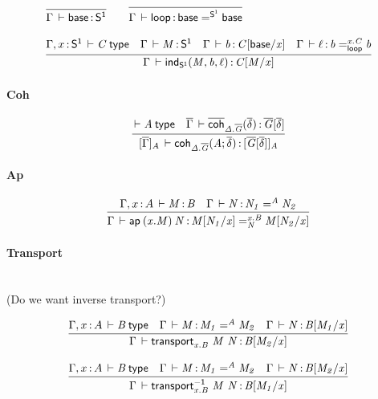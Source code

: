\paragraph{\sone}

\begin{small}
\[
\begin{array}{l}
\infer{\oftp{\Gamma}{\base}{\sone}}{}
\qquad
\infer{\oftp{\Gamma}{\lp}{\iid{\sone}{\base}{\base}}}{}
\\ \\
\infer{\oftp{\Gamma}{\sind{M}{b}{\ell}}{\subst{C}{M}{x}}}
      {\wftp{\Gamma,\tptm{x}{\sone}}{C}
      &\oftp{\Gamma}{M}{\sone}
      &\oftp{\Gamma}{b}{\subst{C}{\base}{x}}
      &\oftp{\Gamma}{\ell}{\iidover{x.C}{\lp}{b}{b}}}
\end{array}
\]
\end{small}

\paragraph{Coh}

\begin{small}
\[
\begin{array}{l}
\infer
  {\oftp{\interpdiag{\diag\Gamma}{A}}
        {\coh{\Delta.\diag G}{A}{\diag\delta}}
        {\interpdiag{\diag G[\diag\delta]}{A}}}
  {\wftp{}{A}
  &\oftp{\diag\Gamma}{\diagcoh{\Delta.\diag G}{\diag\delta}}{\diag
    G[\diag\delta]}}
\end{array}
\]
\end{small}


\paragraph{Ap}
\begin{small}
\[
\begin{array}{l}
\infer{\oftp{\Gamma}{\ap{(x.M)}{N}}{\iidover{x.B}{N}{\subst{M}{N_1}{x}}{\subst{M}{N_2}{x}}}}
      {\oftp{\Gamma,\tptm{x}{A}}{M}{B} & \oftp{\Gamma}{N}{\iid{A}{N_1}{N_2}}}
\end{array}
\]
\end{small}

\paragraph{Transport}

\ \\
(Do we want inverse transport?)

\begin{small}
\[
\begin{array}{l}
\infer{\oftp{\Gamma}{\transport{x.B}{M}{N}}{\subst{B}{M_2}{x}}}
      {\wftp{\Gamma,\tptm{x}{A}}{B} &
       \oftp{\Gamma}{M}{\iid{A}{M_1}{M_2}} &
       \oftp{\Gamma}{N}{\subst{B}{M_1}{x}}}
\\ \\
\infer{\oftp{\Gamma}{\transportinv{x.B}{M}{N}}{\subst{B}{M_1}{x}}}
      {\wftp{\Gamma,\tptm{x}{A}}{B} &
       \oftp{\Gamma}{M}{\iid{A}{M_1}{M_2}} &
       \oftp{\Gamma}{N}{\subst{B}{M_2}{x}}}
\end{array}
\]
\end{small}

